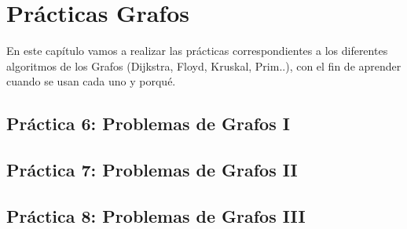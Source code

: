\chapter{Prácticas Grafos}

En este capítulo vamos a realizar las prácticas correspondientes a los diferentes algoritmos de los Grafos (Dijkstra, Floyd, Kruskal, Prim..), con el fin de aprender cuando se usan cada uno y porqué.

\newpage
\section*{Práctica 6: Problemas de Grafos I}
{}
\label{sec:practica6}


\newpage
\section*{Práctica 7: Problemas de Grafos II}
{}
\label{sec:practica7}


\newpage
\section*{Práctica 8: Problemas de Grafos III}
{}
\label{sec:practica8}
